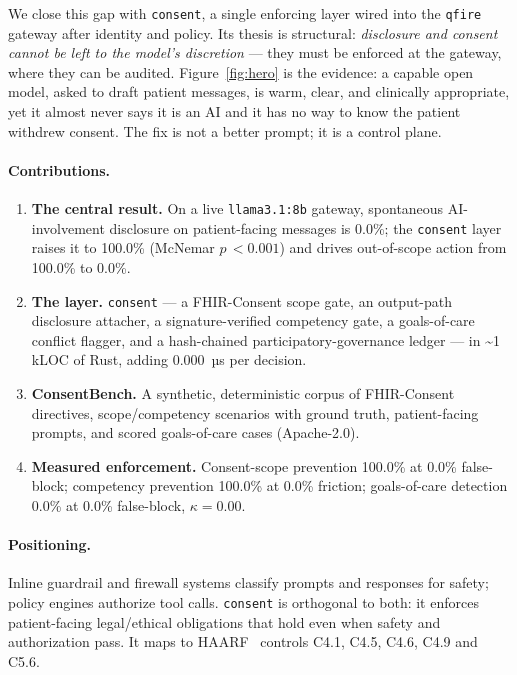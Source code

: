 \documentclass[11pt]{article}
\providecommand{\EoneModel}{llama3.1:8b}
\providecommand{\EoneUngatedDisc}{0.0\%}
\providecommand{\EoneGatedDisc}{100.0\%}
\providecommand{\EoneMcnemarP}{<0.001}
\providecommand{\EoneViolUngated}{100.0\%}
\providecommand{\EoneViolGated}{0.0\%}
\providecommand{\EtwoCVP}{100.0\%}
\providecommand{\EtwoFBR}{0.0\%}
\providecommand{\EfourCGP}{100.0\%}
\providecommand{\EfourFriction}{0.0\%}
\providecommand{\EfiveTPR}{0.0\%}
\providecommand{\EfiveFPR}{0.0\%}
\providecommand{\EfiveKappa}{0.00}
\providecommand{\EsixPerDecisionUs}{0.000}
\begin{document}
We close this gap with \texttt{consent}, a single enforcing layer wired into the
\texttt{qfire} gateway after identity and policy. Its thesis is structural:
\emph{disclosure and consent cannot be left to the model's discretion} --- they must
be enforced at the gateway, where they can be audited. Figure~\ref{fig:hero} is the
evidence: a capable open model, asked to draft patient messages, is warm, clear, and
clinically appropriate, yet it almost never says it is an AI and it has no way to
know the patient withdrew consent. The fix is not a better prompt; it is a control
plane.

\paragraph{Contributions.}
\begin{enumerate}
  \item \textbf{The central result.} On a live \texttt{\EoneModel{}} gateway,
  spontaneous AI-involvement disclosure on patient-facing messages is
  \EoneUngatedDisc{}; the \texttt{consent} layer raises it to \EoneGatedDisc{}
  (McNemar $p\,\EoneMcnemarP{}$) and drives out-of-scope action from
  \EoneViolUngated{} to \EoneViolGated{}.
  \item \textbf{The layer.} \texttt{consent} --- a FHIR-Consent scope gate, an
  output-path disclosure attacher, a signature-verified competency gate, a
  goals-of-care conflict flagger, and a hash-chained participatory-governance
  ledger --- in \textasciitilde1\,kLOC of Rust, adding \EsixPerDecisionUs{}~µs per
  decision.
  \item \textbf{ConsentBench.} A synthetic, deterministic corpus of FHIR-Consent
  directives, scope/competency scenarios with ground truth, patient-facing prompts,
  and scored goals-of-care cases (Apache-2.0).
  \item \textbf{Measured enforcement.} Consent-scope prevention \EtwoCVP{} at
  \EtwoFBR{} false-block; competency prevention \EfourCGP{} at \EfourFriction{}
  friction; goals-of-care detection \EfiveTPR{} at \EfiveFPR{} false-block,
  $\kappa=\EfiveKappa$.
\end{enumerate}

\paragraph{Positioning.} Inline guardrail and firewall systems classify prompts and
responses for safety; policy engines authorize tool calls. \texttt{consent} is
orthogonal to both: it enforces patient-facing legal/ethical obligations that hold
even when safety and authorization pass. It maps to HAARF~\cite{schwoebel2026haarf} controls
C4.1, C4.5, C4.6, C4.9 and C5.6.
\end{document}

